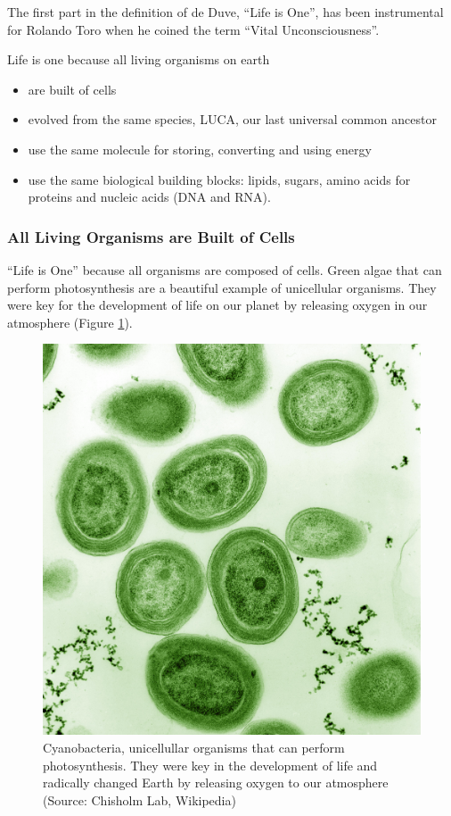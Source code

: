 \documentclass[
  11pt,
]{book}
\providecommand{\tightlist}{%
  \setlength{\itemsep}{0pt}\setlength{\parskip}{0pt}}
\begin{document}
The first part in the definition of de Duve, ``Life is One'', has been instrumental for Rolando Toro when he coined the term ``Vital Unconsciousness''.

Life is one because all living organisms on earth

\begin{itemize}
\tightlist
\item
  are built of cells
\item
  evolved from the same species, LUCA, our last universal common ancestor
\item
  use the same molecule for storing, converting and using energy
\item
  use the same biological building blocks: lipids, sugars, amino acids for proteins and nucleic acids (DNA and RNA).
\end{itemize}

\hypertarget{all-living-organisms-are-built-of-cells}{%
\subsubsection{All Living Organisms are Built of Cells}\label{all-living-organisms-are-built-of-cells}}

``Life is One'' because all organisms are composed of cells.
Green algae that can perform photosynthesis are a beautiful example of unicellular organisms. They were key for the development of life on our planet by releasing oxygen in our atmosphere (Figure \ref{fig:greenAlgae}).

\begin{figure}

{\centering \includegraphics[width=0.3\linewidth]{./figs/Prochlorococcus_marinus} 

}

\caption{Cyanobacteria, unicellullar organisms that can perform photosynthesis. They were key in the development of life and radically changed Earth by releasing oxygen to our atmosphere (Source: Chisholm Lab, Wikipedia)}\label{fig:greenAlgae}
\end{figure}
\end{document}
